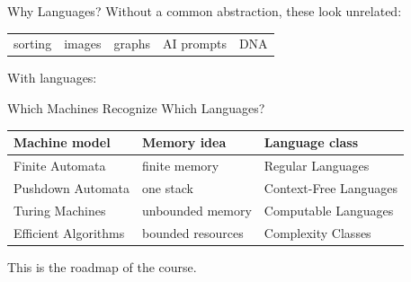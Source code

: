 \documentclass[10pt,aspectratio=169]{beamer}
\begin{document}
\begin{frame}{Why Languages?}
Without a common abstraction, these look unrelated:

\vspace{0.7em}

\begin{center}
\begin{tabular}{ccccc}
sorting & images & graphs & AI prompts & DNA
\end{tabular}
\end{center}

\pause
\vspace{1.5em}

With languages:

\begin{center}
\end{center}


\end{frame}

\begin{frame}{Which Machines Recognize Which Languages?}
\begin{center}
\begin{tabular}{lll}
\toprule
\textbf{Machine model} & \textbf{Memory idea} & \textbf{Language class} \\
\midrule
Finite Automata & finite memory & Regular Languages \\
Pushdown Automata & one stack & Context-Free Languages \\
Turing Machines & unbounded memory & Computable Languages \\
Efficient Algorithms & bounded resources & Complexity Classes \\
\bottomrule
\end{tabular}
\end{center}

\pause
\vspace{1.5em}

\begin{center}
This is the roadmap of the course.
\end{center}
\end{frame}
\end{document}
